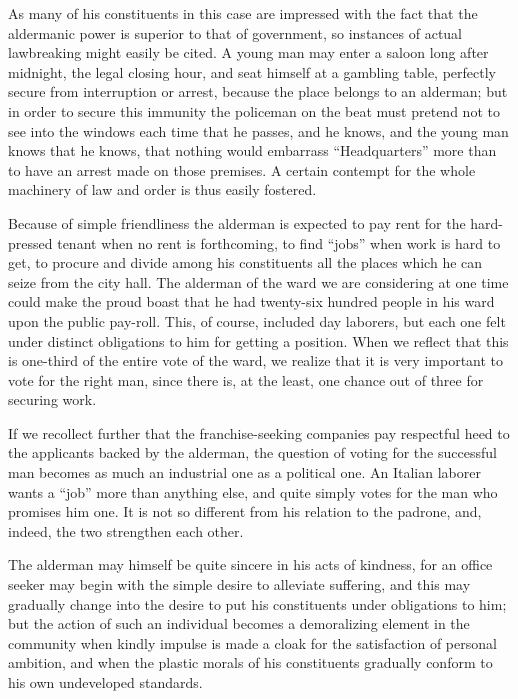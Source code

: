 \documentclass[]{article}
\begin{document}
\begin{sectionbody}
\addamsparagraph As many of his constituents in this case are impressed with the fact
that the aldermanic power is superior to that of government, so
instances of actual lawbreaking might easily be cited. A young man may
enter a saloon long after midnight, the legal closing hour, and seat
himself at a gambling table, perfectly secure from interruption or
arrest, because the place belongs to an alderman; but in order to secure
this immunity the policeman on the beat must pretend not to see into the
windows each time that he passes, and he knows, and the young man knows
that he knows, that nothing would embarrass ``Headquarters'' more than to
have an arrest made on those premises. A certain contempt for the whole
machinery of law and order is thus easily fostered.

\addamsparagraph Because of simple friendliness the alderman is expected to pay rent for
the hard-pressed tenant when no rent is forthcoming, to find ``jobs'' when
work is hard to get, to procure and divide among his constituents all
the places which he can seize from the city hall. The alderman of the
ward we are considering at one time could make the proud boast that he
had twenty-six hundred people in his ward upon the public pay-roll.
This, of course, included day laborers, but each one felt under
distinct obligations to him for getting a position. When we reflect that
this is one-third of the entire vote of the ward, we realize that it is
very important to vote for the right man, since there is, at the least,
one chance out of three for securing work.

\addamsparagraph If we recollect further that the franchise-seeking companies pay
respectful heed to the applicants backed by the alderman, the question
of voting for the successful man becomes as much an industrial one as a
political one. An Italian laborer wants a ``job'' more than anything else,
and quite simply votes for the man who promises him one. It is not so
different from his relation to the padrone, and, indeed, the two
strengthen each other.

\addamsparagraph The alderman may himself be quite sincere in his acts of kindness, for
an office seeker may begin with the simple desire to alleviate
suffering, and this may gradually change into the desire to put his
constituents under obligations to him; but the action of such an
individual becomes a demoralizing element in the community when kindly
impulse is made a cloak for the satisfaction of personal ambition, and
when the plastic morals of his constituents gradually conform to his own
undeveloped standards.


\end{sectionbody}
\end{document}
